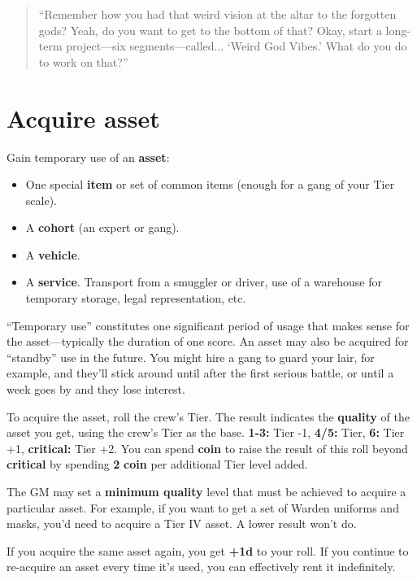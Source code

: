 \documentclass[11pt,fleqn,a5paper]{book}
\newcommand{\gameterm}[1]{\textbf{#1}}
\begin{document}
\begin{quote}
	“Remember how you had that weird vision at the altar to the forgotten gods? Yeah, do you want to get to the bottom of that? Okay, start a long-term project---six segments---called... ‘Weird God Vibes.’ What do you do to work on that?”
\end{quote} 

\section{Acquire asset}

Gain temporary use of an \textbf{asset}:

\begin{itemize}
	\item One special \textbf{item} or set of common items (enough for a gang of your Tier scale).
	\item A \textbf{cohort} (an expert or gang).
	\item A \textbf{vehicle}.
	\item A \textbf{service}. Transport from a smuggler or driver, use of a warehouse for temporary storage, legal representation, etc.
\end{itemize}

“Temporary use” constitutes one significant period of usage that makes sense for the asset---typically the duration of one score. An asset may also be acquired for “standby” use in the future. You might hire a gang to guard your lair, for example, and they’ll stick around until after the first serious battle, or until a week goes by and they lose interest.

To acquire the asset, roll the crew’s Tier. The result indicates the \textbf{quality} of the asset you get, using the crew’s Tier as the base. \gameterm{1-3:}  Tier -1, \gameterm{4/5:}  Tier, \gameterm{6:}  Tier +1, \gameterm{critical:}  Tier +2. You can spend \gameterm{coin}  to raise the result of this roll beyond \gameterm{critical}  by spending \textbf{2} \gameterm{coin}  per additional Tier level added.

The GM may set a \textbf{minimum quality} level that must be achieved to acquire a particular asset. For example, if you want to get a set of Warden uniforms and masks, you’d need to acquire a Tier IV asset. A lower result won’t do.

If you acquire the same asset again, you get \textbf{+1d} to your roll. If you continue to re-acquire an asset every time it’s used, you can effectively rent it indefinitely.
\end{document}
